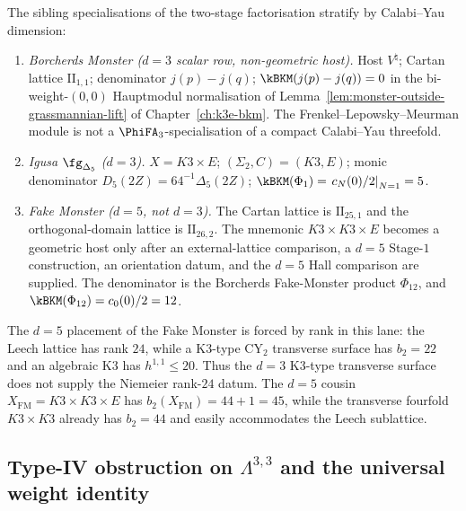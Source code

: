 \begin{conjecture}
\label{conj:k3e-cy3-platonic-siblings-by-d}
\ClaimStatusConjectured
{}
The sibling specialisations of the two-stage factorisation stratify by Calabi--Yau dimension:
\begin{enumerate}[label=\textup{(\arabic*)}]
\item \emph{Borcherds Monster ($d = 3$ scalar row, non-geometric host).} Host \(V^\natural\); Cartan lattice \(\mathrm{II}_{1,1}\); denominator \(j(p)-j(q)\); \(\kBKM(j(p)-j(q))=0\) in the bi-weight-\((0,0)\) Hauptmodul normalisation of Lemma~\ref{lem:monster-outside-grassmannian-lift} of Chapter~\ref{ch:k3e-bkm}. The Frenkel--Lepowsky--Meurman module is not a \(\PhiFA_3\)-specialisation of a compact Calabi--Yau threefold.
\item \emph{Igusa $\fg_{\Delta_5}$ ($d = 3$).} $X = K3 \times E$; $(\Sigma_2, C) = (K3, E)$; monic denominator $D_5(2Z)=64^{-1}\Delta_5(2Z)$; $\kBKM(\Phi_1) = \left.c_N(0)/2\right|_{N=1} = 5$.
\item \emph{Fake Monster ($d = 5$, \emph{not} $d = 3$).} The Cartan lattice is $\mathrm{II}_{25,1}$ and the orthogonal-domain lattice is $\mathrm{II}_{26,2}$. The mnemonic $K3 \times K3 \times E$ becomes a geometric host only after an external-lattice comparison, a $d=5$ Stage-$1$ construction, an orientation datum, and the $d=5$ Hall comparison are supplied. The denominator is the Borcherds Fake-Monster product \(\Phi_{12}\), and $\kBKM(\Phi_{12})=c_0(0)/2=12$.
\end{enumerate}
The $d = 5$ placement of the Fake Monster is forced by rank in this lane: the Leech lattice has rank $24$, while a K3-type CY$_2$ transverse surface has $b_2=22$ and an algebraic K3 has $h^{1, 1}\leq20$. Thus the $d=3$ K3-type transverse surface does not supply the Niemeier rank-$24$ datum. The $d = 5$ cousin $X_{\mathrm{FM}} = K3 \times K3 \times E$ has $b_2(X_{\mathrm{FM}}) = 44 + 1 = 45$, while the transverse fourfold $K3 \times K3$ already has $b_2=44$ and easily accommodates the Leech sublattice.
\end{conjecture}

\subsection{Type-IV obstruction on \texorpdfstring{$\Lambda^{3, 3}$}{Lambda-3, 3} and the universal weight identity}
\label{subsec:k3e-cy3-platonic-envelope-universal}

